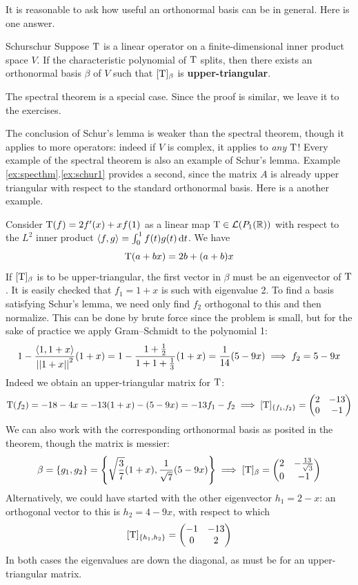 \pagebreak[3]



It is reasonable to ask how useful an orthonormal basis can be in general. Here is one answer.

\begin{lemm}{Schur}{schur}
	Suppose $\mathrm{T}$ is a linear operator on a finite-dimensional inner product space $V$. If the characteristic polynomial of $\mathrm{T}$ splits, then there exists an orthonormal basis $\beta$ of $V$ such that $[\mathrm{T}]_\beta$ is \textbf{upper-triangular}.
\end{lemm}

The spectral theorem is a special case. Since the proof is similar, we leave it to the exercises.\smallbreak

The conclusion of Schur's lemma is weaker than the spectral theorem, though it applies to more operators: indeed if $V$ is complex, it applies to \emph{any} $\mathrm{T}$! Every example of the spectral theorem is also an example of Schur's lemma. Example \ref*{ex:specthm}.\ref{ex:schur1} provides a second, since the matrix $A$ is already upper triangular with respect to the standard orthonormal basis. Here is a another example.

\begin{example}{}{}
	Consider $\mathrm{T}(f)=2f'(x)+xf(1)$ as a linear map $\mathrm{T}\in\mathcal{L}(P_1(\mathbb{R}))$ with respect to the $L^2$ inner product $\left\langle f,g\right\rangle=\int_0^1f(t)g(t)\,{\mathrm{d} t}$. We have
	\[
		\mathrm{T}(a+bx)=2b+(a+b)x
	\]
	If $[\mathrm{T}]_\beta$ is to be upper-triangular, the first vector in $\beta$ must be an eigenvector of $\mathrm{T}$.
	It is easily checked that $f_1=1+x$ is such with eigenvalue 2. To find a basis satisfying Schur's lemma, we need only find $f_2$ orthogonal to this and then normalize. This can be done by brute force since the problem is small, but for the sake of practice we apply Gram--Schmidt to the polynomial 1:
	\[
		1-\frac{\left\langle 1,1+x\right\rangle}{\left| \left| 1+x\right|\right|^2}(1+x)= 1-\frac{1+\frac 12}{1+1+\frac 13}(1+x)=\frac 1{14}(5-9x) \implies f_2=5-9x
	\]
	Indeed we obtain an upper-triangular matrix for $\mathrm{T}$:
	\[
		\mathrm{T}(f_2)=-18-4x =-13(1+x)-(5-9x) =-13f_1-f_2
		\implies [\mathrm{T}]_{\{f_1,f_2\}}=
		\begin{pmatrix}
			2&-13\\
			0&-1
		\end{pmatrix}
	\]
	We can also work with the corresponding orthonormal basis as posited in the theorem, though the matrix is messier:
	\[
		\beta=\{g_1,g_2\}=\left\{\sqrt{\frac 37}(1+x),\frac 1{\sqrt 7}(5-9x)\right\} 
		\implies [\mathrm{T}]_\beta=
		\begin{pmatrix}
			2&-\frac{13}{\sqrt 3}\\
			0&-1
		\end{pmatrix}
	\]
	Alternatively, we could have started with the other eigenvector $h_1=2-x$: an orthogonal vector to this is $h_2=4-9x$, with respect to which
	\[
		[\mathrm{T}]_{\{h_1,h_2\}}=
		\begin{pmatrix}
			-1&-13\\
			0&2
		\end{pmatrix}
	\]
	In both cases the eigenvalues are down the diagonal, as must be for an upper-triangular matrix.
\end{example}

